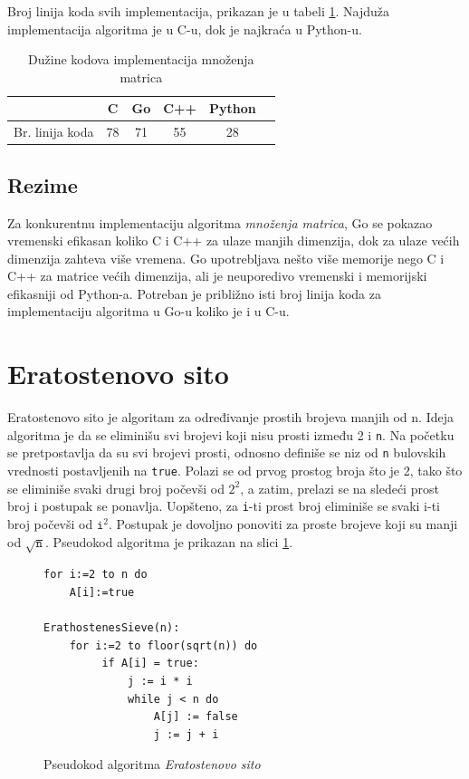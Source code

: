 \documentclass[12pt,oneside]{memoir}
\begin{document}
Broj linija koda svih  implementacija, prikazan je u tabeli \ref{tab:matrix2}. Najduža implementacija algoritma je u C-u, dok je najkraća u Python-u.
\begin{table}
\begin{center}
\caption{Dužine kodova implementacija množenja matrica}
\begin{tabular}{|c|c|c|c|c|c|}
\hline
		&  C 	& Go	& C++	& Python	\\ \hline
Br. linija koda& 78	& 71	&55		&28		\\ \hline
\end{tabular}
\label{tab:matrix2}
\end{center}
\end{table}

\subsection{Rezime}

Za konkurentnu implementaciju algoritma \textit{množenja matrica}, Go se pokazao vremenski efikasan koliko C i C++ za ulaze manjih dimenzija, dok za ulaze većih dimenzija zahteva više vremena. Go upotrebljava nešto više memorije nego C i C++ za matrice većih dimenzija, ali je neuporedivo vremenski i memorijski efikasniji od Python-a. Potreban je približno isti broj linija koda za implementaciju algoritma u Go-u koliko je i u C-u.


\section{Eratostenovo sito} \label{erathost}
Eratostenovo sito je algoritam za određivanje prostih brojeva manjih od n. Ideja algoritma je da se eliminišu svi brojevi koji nisu prosti između 2 i \texttt{n}. Na početku se pretpostavlja da su svi brojevi prosti, odnosno definiše se niz od \texttt{n} bulovskih vrednosti postavljenih na \texttt{true}. Polazi se od prvog prostog broja što je 2, tako što se eliminiše svaki drugi broj počevši od $2^{2}$, a zatim, prelazi se na sledeći prost broj i postupak se ponavlja. Uopšteno, za \texttt{i}-ti prost broj eliminiše se svaki i-ti broj počevši od  $\texttt{i}^{2}$. Postupak je dovoljno ponoviti za proste brojeve koji su manji od $\sqrt{\texttt{n}}$. Pseudokod algoritma je prikazan na slici \ref{fig:prime_pseudo}.

\begin{figure}
\begin{center}

\begin{Verbatim}[fontsize=\small]
for i:=2 to n do
    A[i]:=true

ErathostenesSieve(n):
    for i:=2 to floor(sqrt(n)) do 
         if A[i] = true:
             j := i * i
             while j < n do
                 A[j] := false 
                 j := j + i
\end{Verbatim}

\caption{Pseudokod algoritma \textit{Eratostenovo sito}}
\label{fig:prime_pseudo}
\end{center}
\end{figure}
\end{document}

